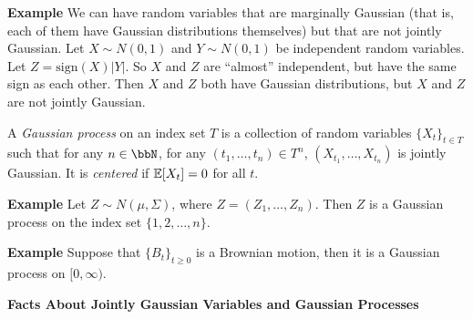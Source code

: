 \documentclass[../../../Master/AppliedStochastics.tex]{subfiles}
\begin{document}
\textbf{Example}
We can have random variables that are marginally Gaussian
    (that is, each of them have Gaussian distributions themselves)
    but that are not jointly Gaussian.
Let $X \sim N(0, 1)$ and $Y \sim N(0, 1)$ be independent random variables.
Let $Z = \mathrm{sign}(X)|Y|$.
So $X$ and $Z$ are ``almost'' independent,
    but have the same sign as each other.
Then $X$ and $Z$ both have Gaussian distributions,
    but $X$ and $Z$ are not jointly Gaussian.


\begin{definition}
    A \emph{Gaussian process} on an index set $T$ is a collection of
        random variables $\{X_t\}_{t \in T}$ such that
            for any $n \in \bbN$, for any $(t_1, \dots, t_n) \in T^n$,
            $(X_{t_1}, \dots, X_{t_n})$ is jointly Gaussian.
    It is \emph{centered} if $\mathbb{E}[X_t] = 0$ for all $t$.
\end{definition}


\textbf{Example}
Let $Z \sim N(\mu, \Sigma)$, where $Z = (Z_1, \dots, Z_n)$.
Then $Z$ is a Gaussian process on the index set $\{1, 2, \dots, n\}$.


\textbf{Example}
Suppose that $\{B_t\}_{t \geq 0}$ is a Brownian motion,
    then it is a Gaussian process on $[0,\infty)$.


\textbf{\Large Facts About Jointly Gaussian Variables and Gaussian Processes}
\end{document}
